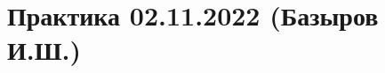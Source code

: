 \documentclass[main.tex]{subfiles}
\begin{document}

\section{Практика 02.11.2022 (Базыров И.Ш.)}
\end{document}

